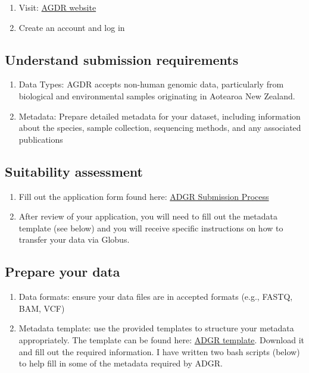\documentclass[
]{article}
\begin{document}
\begin{enumerate}
\def\labelenumi{\arabic{enumi}.}
\item
  Visit: \href{https://data.agdr.org.nz/}{AGDR website}
\item
  Create an account and log in
\end{enumerate}

\hypertarget{understand-submission-requirements}{%
\subsection{Understand submission
requirements}\label{understand-submission-requirements}}

\begin{enumerate}
\def\labelenumi{\arabic{enumi}.}
\item
  Data Types: AGDR accepts non-human genomic data, particularly from
  biological and environmental samples originating in Aotearoa New
  Zealand.
\item
  Metadata: Prepare detailed metadata for your dataset, including
  information about the species, sample collection, sequencing methods,
  and any associated publications
\end{enumerate}

\hypertarget{suitability-assessment}{%
\subsection{Suitability assessment}\label{suitability-assessment}}

\begin{enumerate}
\def\labelenumi{\arabic{enumi}.}
\item
  Fill out the application form found here:
  \href{https://docs.agdr.org.nz/user_guides/submission_process/}{ADGR
  Submission Process}
\item
  After review of your application, you will need to fill out the
  metadata template (see below) and you will receive specific
  instructions on how to transfer your data via Globus.
\end{enumerate}

\hypertarget{prepare-your-data-1}{%
\subsection{Prepare your data}\label{prepare-your-data-1}}

\begin{enumerate}
\def\labelenumi{\arabic{enumi}.}
\item
  Data formats: ensure your data files are in accepted formats (e.g.,
  FASTQ, BAM, VCF)
\item
  Metadata template: use the provided templates to structure your
  metadata appropriately. The template can be found here:
  \href{https://docs.google.com/spreadsheets/d/1be8T4JalxRopM7pVFzTuempBGlqqhMQ_8MryGsjHI5E/edit?gid=188280636\#gid=188280636}{ADGR
  template}. Download it and fill out the required information. I have
  written two bash scripts (below) to help fill in some of the metadata
  required by ADGR.
\end{enumerate}
\end{document}
